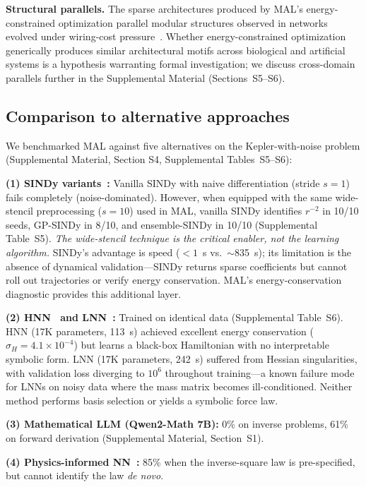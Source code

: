 \documentclass[aps,pre,reprint,superscriptaddress,longbibliography]{revtex4-2}
\begin{document}
\textbf{Structural parallels.} The sparse architectures produced by MAL's energy-constrained optimization parallel modular structures observed in networks evolved under wiring-cost pressure~\cite{Clune2013, Bullmore2012}. Whether energy-constrained optimization generically produces similar architectural motifs across biological and artificial systems is a hypothesis warranting formal investigation; we discuss cross-domain parallels further in the Supplemental Material (Sections~S5--S6).

\subsection{Comparison to alternative approaches}
We benchmarked MAL against five alternatives on the Kepler-with-noise problem (Supplemental Material, Section S4, Supplemental Tables~S5--S6):

\textbf{(1) SINDy variants~\cite{Brunton2016, Hirsh2022GPSINDy, Fasel2022EnsembleSINDy}:} Vanilla SINDy with naive differentiation (stride $s=1$) fails completely (noise-dominated). However, when equipped with the same wide-stencil preprocessing ($s=10$) used in MAL, vanilla SINDy identifies $r^{-2}$ in 10/10 seeds, GP-SINDy in 8/10, and ensemble-SINDy in 10/10 (Supplemental Table~S5). \textit{The wide-stencil technique is the critical enabler, not the learning algorithm.} SINDy's advantage is speed ($<1$~s vs.\ $\sim$835~s); its limitation is the absence of dynamical validation---SINDy returns sparse coefficients but cannot roll out trajectories or verify energy conservation. MAL's energy-conservation diagnostic provides this additional layer.

\textbf{(2) HNN~\cite{Greydanus2019} and LNN~\cite{Cranmer2020LNN}:} Trained on identical data (Supplemental Table~S6). HNN (17K parameters, 113~s) achieved excellent energy conservation ($\sigma_H = 4.1 \times 10^{-4}$) but learns a black-box Hamiltonian with no interpretable symbolic form. LNN (17K parameters, 242~s) suffered from Hessian singularities, with validation loss diverging to $10^6$ throughout training---a known failure mode for LNNs on noisy data where the mass matrix becomes ill-conditioned. Neither method performs basis selection or yields a symbolic force law.

\textbf{(3) Mathematical LLM (Qwen2-Math 7B):} 0\% on inverse problems, 61\% on forward derivation (Supplemental Material, Section~S1).

\textbf{(4) Physics-informed NN~\cite{Raissi2019}:} 85\% when the inverse-square law is pre-specified, but cannot identify the law \textit{de novo}.
\end{document}
